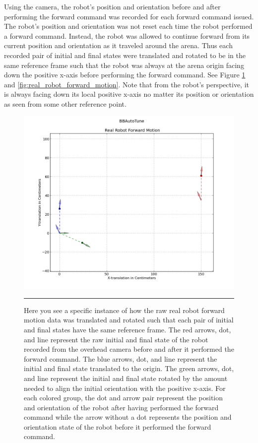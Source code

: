 Using the camera, the robot's position and orientation before and after performing the forward command was recorded for each forward command issued. The robot's position and orientation was not reset each time the robot performed a forward command. Instead, the robot was allowed to continue forward from its current position and orientation as it traveled around the arena. Thus each recorded pair of initial and final states were translated and rotated to be in the same reference frame such that the robot was always at the arena origin facing down the positive x-axis before performing the forward command. See Figure \ref{fig:real_robot_raw_trans_rot} and \ref{fig:real_robot_forward_motion}. Note that from the robot's perspective, it is always facing down its local positive x-axis no matter its position or orientation as seen from some other reference point.

\begin{figure}[htbp]
\centering
\includegraphics[scale=0.6]{../Figures/Chapter4/real_robot_raw_trans_rot.png}
\rule{35em}{0.5pt}
\caption[Real Robot Forward Motion Data Translated and Rotated Example]{Here you see a specific instance of how the raw real robot forward motion data was translated and rotated such that each pair of initial and final states have the same reference frame. The red arrows, dot, and line represent the raw initial and final state of the robot recorded from the overhead camera before and after it performed the forward command. The blue arrows, dot, and line represent the initial and final state translated to the origin. The green arrows, dot, and line represent the initial and final state rotated by the amount needed to align the initial orientation with the positive x-axis. For each colored group, the dot and arrow pair represent the position and orientation of the robot after having performed the forward command while the arrow without a dot represents the position and orientation state of the robot before it performed the forward command.}
\label{fig:real_robot_raw_trans_rot}
\end{figure}

